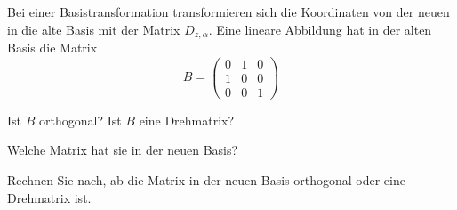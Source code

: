 Bei einer Basistransformation transformieren sich die
Koordinaten
von der neuen in die alte Basis mit der Matrix
$D_{z,\alpha}$. Eine lineare Abbildung hat
in der alten Basis die Matrix
\[
B=
\begin{pmatrix}
0&1&0\\
1&0&0\\
0&0&1
\end{pmatrix}
\]
\begin{teilaufgaben}
\item Ist $B$ orthogonal? Ist $B$ eine Drehmatrix?
\item Welche Matrix hat sie in der neuen Basis?
\item Rechnen Sie nach, ab die Matrix in der neuen Basis orthogonal oder
eine Drehmatrix ist.
\end{teilaufgaben}

